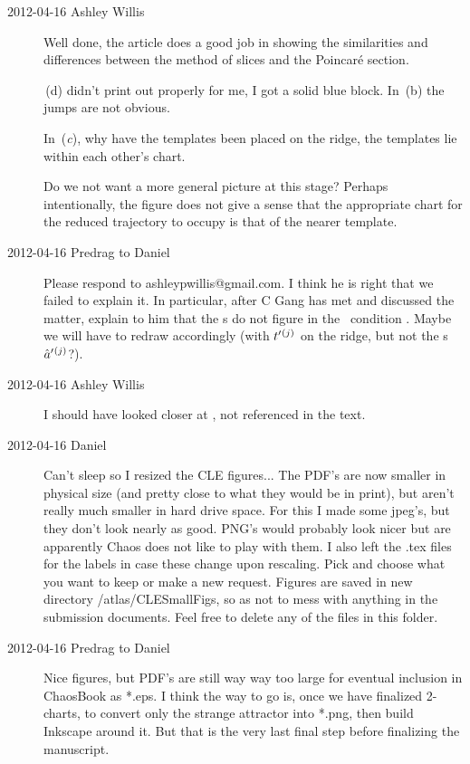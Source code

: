 \begin{description}
\item[2012-04-16 Ashley Willis] Well done, the article does a good job in
showing the similarities and differences between the method of slices and
the Poincar\'e section.

\,(d) didn't print out properly for me, I got a
solid blue block.  In \,(b) the jumps are not
obvious.

In \,({\it c}), why have the templates been
placed on the ridge, the templates lie within each other's chart.

Do we not want a more general picture at this stage?  Perhaps
intentionally, the figure does not give a sense that the appropriate chart for
the reduced trajectory to occupy is that of the nearer template.

\item[2012-04-16 Predrag to Daniel] Please respond to
ashleypwillis@gmail.com. I think he is right that we failed to explain
it. In particular, after C Gang has met and discussed the matter, explain
to him that the \template s do not figure in the \slice\ condition
. Maybe we will have to redraw 
accordingly (with $t'_{}{}^{(j)}$ on the ridge, but not the
\template s\ $\hat{a}'{}^{(j)}$?).

\item[2012-04-16 Ashley Willis] I should have looked closer at
, not referenced in the text.

\item[2012-04-16 Daniel]
Can't sleep so I resized the CLE figures... The PDF's are now smaller in
physical size (and pretty close to what they would be in print), but
aren't really much smaller in hard drive space. For this I made some
jpeg's, but they don't look nearly as good. PNG's would probably look
nicer but are apparently Chaos does not like to play with them. I also
left the .tex files for the labels in case these change upon rescaling.
Pick and choose what you want to keep or make a new request. Figures are
saved in new directory /atlas/CLESmallFigs, so as not to mess with
anything in the submission documents. Feel free to delete any of the
files in this folder.

\item[2012-04-16 Predrag to Daniel] Nice figures, but PDF's are still way
way too large for eventual inclusion in ChaosBook as *.eps. I think the
way to go is, once we have finalized 2-charts, to convert only the
strange attractor into *.png, then build Inkscape around it. But that is
the very last final step before finalizing the manuscript.


\end{description}
